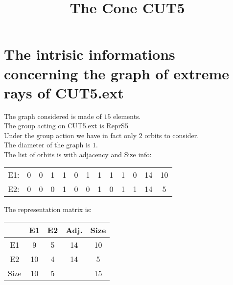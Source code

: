 \documentclass[12pt]{article}
\title{The Cone CUT5}
\begin{document}
\maketitle
\section{The intrisic informations concerning the graph of extreme rays of CUT5.ext}
The graph considered is made of $15$ elements.\\
The group acting on CUT5.ext is ReprS5\\
Under the group action we have in fact only $2$ orbits to consider.\\
The diameter of the graph is $1$.\\
The list of orbits is with adjacency and Size info:
\begin{center}
\scriptsize
\begin{tabular}{ccccccccccc|c|c}
E1:&0&0&1&1&0&1&1&1&1&0&14&10\\
E2:&0&0&0&1&0&0&1&0&1&1&14&5\\
\end{tabular}
\end{center}
The representation matrix is:
\begin{center}
\scriptsize
\begin{tabular}{|c|cc|c|c|}
\hline
&E1&E2&Adj.&Size\\
\hline
E1& 9& 5&14&10\\
E2& 10& 4&14&5\\
\hline
Size&10&5&&15\\
\hline
\end{tabular}
\end{center}
\end{document}

